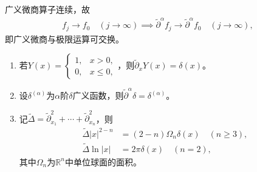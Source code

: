 \documentclass[../../main.tex]{subfiles}%
\begin{document}
\begin{remark}
广义微商算子连续，故
\begin{align*}
f_j\to f_0\quad(j\to\infty)\implies\widetilde{\partial}^\alpha f_j\to\widetilde{\partial}^\alpha f_0\quad(j\to\infty),
\end{align*}
即广义微商与极限运算可交换。
\end{remark}

\begin{proposition}
\begin{enumerate}[]
\item 若$Y(x)=\begin{cases}1,&x>0,\\0,&x\leqslant0,\end{cases}$，则$\widetilde{\partial}_x Y(x)=\delta(x)$。

\item 设$\delta^{(\alpha)}$为$\alpha$阶$\delta$广义函数，则$\widetilde{\partial}^\alpha\delta=\delta^{(\alpha)}$。

\item 记$\widetilde{\Delta}=\widetilde{\partial}_{x_1}^2+\cdots+\widetilde{\partial}_{x_n}^2$，则
\begin{align*}
\widetilde{\Delta}|x|^{2-n}&=(2-n)\Omega_n\delta(x)\quad(n\geqslant3),\\
\widetilde{\Delta}\ln|x|&=2\pi\delta(x)\quad(n=2),
\end{align*}
其中$\Omega_n$为$\mathbb{R}^n$中单位球面的面积。
\end{enumerate}
\end{proposition}
\end{document}
